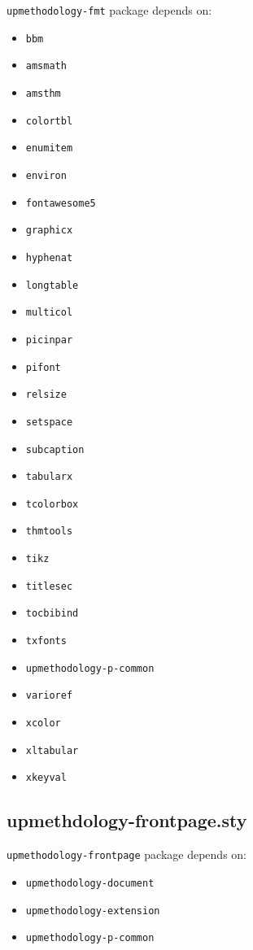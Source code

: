 \documentclass[book,taskpackage,specpackage,codepackage]{upmethodology-document}
\begin{document}
\texttt{upmethodology-fmt} package depends on:
\begin{itemize}
\item \texttt{bbm}
\item \texttt{amsmath}
\item \texttt{amsthm}
\item \texttt{colortbl}
\item \texttt{enumitem}
\item \texttt{environ}
\item \texttt{fontawesome5}
\item \texttt{graphicx}
\item \texttt{hyphenat}
\item \texttt{longtable}
\item \texttt{multicol}
\item \texttt{picinpar}
\item \texttt{pifont}
\item \texttt{relsize}
\item \texttt{setspace}
\item \texttt{subcaption}
\item \texttt{tabularx}
\item \texttt{tcolorbox}
\item \texttt{thmtools}
\item \texttt{tikz}
\item \texttt{titlesec}
\item \texttt{tocbibind}
\item \texttt{txfonts}
\item \texttt{upmethodology-p-common}
\item \texttt{varioref}
\item \texttt{xcolor}
\item \texttt{xltabular}
\item \texttt{xkeyval}
\end{itemize}

\subsection{upmethdology-frontpage.sty}

\texttt{upmethodology-frontpage} package depends on:
\begin{itemize}
\item \texttt{upmethodology-document}
\item \texttt{upmethodology-extension}
\item \texttt{upmethodology-p-common}
\end{itemize}
\end{document}
